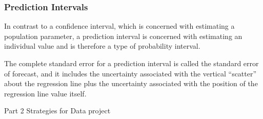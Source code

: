 \subsubsection{Prediction Intervals}
In contrast to a confidence interval, which is concerned with estimating a population parameter, a prediction interval is concerned with estimating an individual value and is therefore a type of probability interval. 

The complete standard error for a prediction interval is called the standard error of forecast, and it includes the uncertainty associated with the vertical “scatter” about the regression line plus the uncertainty associated with the position of the regression line value itself.





Part 2 Strategies for Data project
